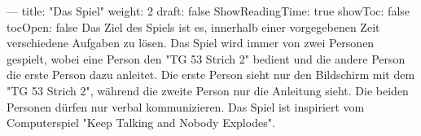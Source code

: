 \markdownRendererDocumentBegin
--- title: "Das Spiel" weight: 2 draft: false ShowReadingTime: true showToc: false tocOpen: false\markdownRendererInterblockSeparator
{}\markdownRendererSectionBegin
\markdownRendererSectionBegin
{}\markdownRendererInterblockSeparator
{}
\markdownRendererSectionEnd \markdownRendererSectionBegin
{}\markdownRendererInterblockSeparator
{}Das Ziel des Spiels ist es, innerhalb einer vorgegebenen Zeit verschiedene Aufgaben zu lösen. Das Spiel wird immer von zwei Personen gespielt, wobei eine Person den "TG 53 Strich 2" bedient und die andere Person die erste Person dazu anleitet. Die erste Person sieht nur den Bildschirm mit dem "TG 53 Strich 2", während die zweite Person nur die Anleitung sieht. Die beiden Personen dürfen nur verbal kommunizieren. Das Spiel ist inspiriert vom Computerspiel "Keep Talking and Nobody Explodes".
\markdownRendererSectionEnd 
\markdownRendererSectionEnd \markdownRendererDocumentEnd